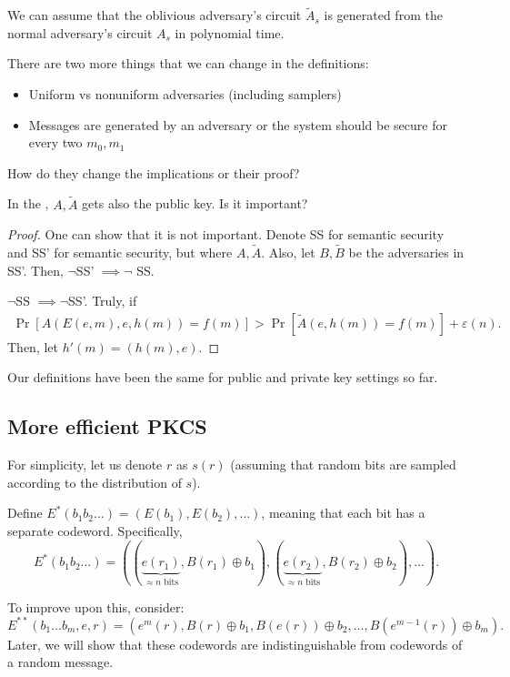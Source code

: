 \begin{remark}
	We can assume that the oblivious adversary's circuit $\tilde A_s$ is generated from the normal adversary's circuit  $A_s$ in polynomial time.
\end{remark}

\begin{exercise}
	There are two more things that we can change in the definitions:
	\begin{itemize}
		\item Uniform vs nonuniform adversaries (including samplers)
		\item Messages are generated by an adversary or the system should be secure for every two $m_0, m_1$
	\end{itemize}
	How do they change the implications or their proof?
\end{exercise}

\begin{exercise}
    In the , $A, \tilde A$ gets also the public key.
	Is it important?
\end{exercise}
\begin{proof}
    One can show that it is not important.
    Denote SS for semantic security and SS' for semantic security, but where $A, \tilde{A}$.
    Also, let $B, \tilde{B}$ be the adversaries in SS'.
    Then, $\neg$SS' $\implies \neg$ SS.

    $\neg$SS $\implies \neg$SS'.
    Truly, if 
    \begin{align*}
	\Pr[A(E(e, m), e, h(m)) = f(m)] > \Pr[\tilde{A}(e, h(m)) = f(m)] + \varepsilon(n).
    \end{align*}
    Then, let $h'(m) = (h(m), e)$.
\end{proof}
\begin{remark}
	Our definitions have been the same for public and private key settings so far.
\end{remark}

\subsection{More efficient PKCS}

For simplicity, let us denote $r$ as $s(r)$ (assuming that random bits are sampled according to the distribution of $s$).

Define $E^*(b_1 b_2 \ldots) = (E(b_1), E(b_2), \ldots)$, meaning that each bit has a separate codeword. Specifically,
\[
	E^*(b_1 b_2 \ldots) = \left(\left(\underbrace{e(r_1)}_{\approx n \text{ bits}}, B(r_1) \oplus b_1\right), \left(\underbrace{e(r_2)}_{\approx n \text{ bits}}, B(r_2) \oplus b_2\right), \ldots\right).
\] 

To improve upon this, consider:
\[
	E^{**}(b_1 \ldots b_m, e, r) = \left(e^{m}(r), B(r) \oplus b_1, B(e(r)) \oplus b_2, \ldots, B(e^{m - 1}(r)) \oplus b_m\right).
\] 
Later, we will show that these codewords are indistinguishable from codewords of a random message.
